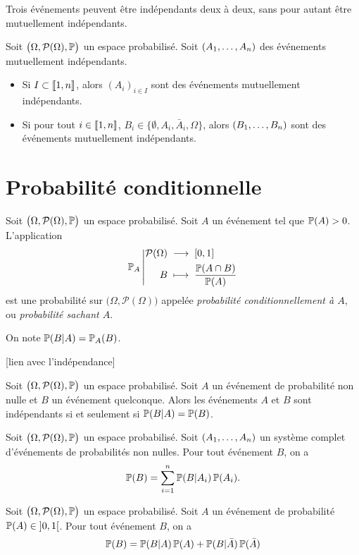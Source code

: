\documentclass{yann}
\newcommand{\Part}{\mathcal{P}}
\newcommand{\Pro}{\bigl(\Omega, \Part(\Omega)\bigr)}
\newcommand{\Prob}{\bigl(\Omega, \Part(\Omega), \P\bigr)}
\begin{document}

Trois événements peuvent être indépendants deux à deux, sans pour autant être mutuellement indépendants.


Soit $\Prob$ un espace probabilisé.
Soit $\nUplet A1n$ des événements mutuellement indépendants.
\begin{itemize}
\item
Si $I\subset\Dcro{1,n}$,
  alors $(A_i)_{i\in I}$ sont des événements mutuellement indépendants.
\item
Si pour tout $i\in\Dcro{1,n}$, $B_i \in \bigl\{ \emptyset, A_i, \bar A_i,\Omega \bigr\}$,
  alors $\nUplet B1n$ sont des événements mutuellement indépendants.
\end{itemize}

\section{Probabilité conditionnelle}


Soit $\Prob$ un espace probabilisé.
Soit $A$ un événement tel que $\P(A)>0$.
L'application
\[ \Fonction{\P_A}{\Part(\Omega)}{[0,1]}{B}{\frac{\P(A\cap B)}{\P(A)}} \]
est une probabilité sur $\Pro$
appelée \emph{probabilité conditionnellement à $A$},
ou \emph{probabilité sachant $A$}.

On note $\P(B|A) = \P_A(B)$.

[lien avec l'indépendance]

Soit $\Prob$ un espace probabilisé.
Soit $A$ un événement de probabilité non nulle
et $B$ un événement quelconque.
Alors les événements $A$ et $B$ sont indépendants si et seulement si $\P(B|A)=\P(B)$.


Soit $\Prob$ un espace probabilisé.
Soit $\nUplet A1n$ un système complet d'événements de probabilités non nulles.
Pour tout événement $B$, on a
\[ \P(B) = \sum_{i=1}^n \P(B|A_i)\P(A_i). \]


Soit $\Prob$ un espace probabilisé.
Soit $A$ un événement de probabilité $\P(A) \in \intO{0,1}$.
Pour tout événement $B$, on a
\[ \P(B) = \P(B|A)\P(A) + \P(B|\bar A)\P(\bar A) \]

\end{document}

